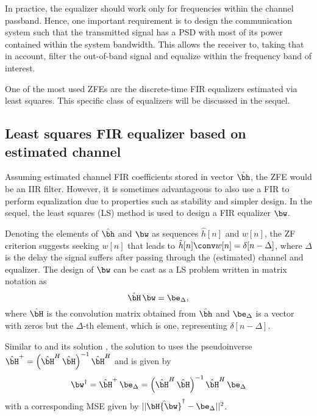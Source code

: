 In practice, the equalizer should work only for frequencies within the channel passband.
Hence, one important requirement is to design the communication system such that the transmitted signal has a PSD with most of its power contained within the system bandwidth. This allows the receiver to, taking that in account, filter the out-of-band signal and equalize within the frequency band of interest.

One of the most used ZFEs are the discrete-time FIR equalizers estimated
via least squares. This specific class of equalizers will be discussed in the sequel.

\subsection{Least squares FIR equalizer based on estimated channel}

Assuming estimated channel FIR coefficients stored in vector $\hat {\bh}$, the ZFE would be
an IIR filter. However, it is sometimes advantageous to also use a FIR to perform equalization
due to properties such as stability and simpler design.
In the sequel, the least squares (LS) method is used to design a FIR equalizer $\bw$.

Denoting the elements of $\hat {\bh}$ and $\bw$ as sequences $\hat h[n]$ and $w[n]$,
the ZF criterion suggests seeking $w[n]$ that leads to $\hat h[n] \conv w[n] = \delta[n-\Delta]$, where $\Delta$ is the delay the signal suffers after passing through the
(estimated) channel and equalizer. The design of $\bw$ can be cast as a LS problem
 written in matrix notation as
\begin{equation}
\hat \bH \, \bw = \be_{\Delta},
\label{eq:ls_equalizer}
\end{equation}
where $\hat \bH$ is the convolution matrix obtained from $\hat \bh$ and $\be_{\Delta}$ is a vector with zeros but the $\Delta$-th element, which is one, representing $\delta[n-\Delta]$.

Similar to  and its solution , the 
solution to  uses the pseudoinverse $\hat \bH^+ = \left(\hat \bH^H \, \hat \bH \right)^{-1}  \hat \bH^H$ and is given by
\begin{equation}
{\bw}^\dag = \hat \bH^+ \,  \be_{\Delta} = \left(\hat \bH^H \, \hat \bH \right)^{-1}  \hat \bH^H \,  \be_{\Delta}
\label{eq:ls_solution2}
\end{equation}
with a corresponding MSE given by $||\hat \bH {\bw}^\dag - \be_{\Delta}||^2$.

